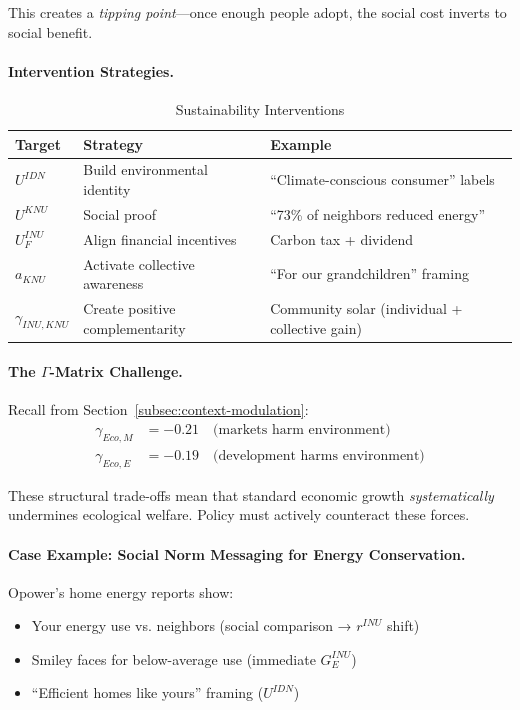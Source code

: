 This creates a \emph{tipping point}---once enough people adopt, 
the social cost inverts to social benefit.

\paragraph{Intervention Strategies.}

\begin{table}[htbp]
\centering
\caption{Sustainability Interventions}
\label{tab:sustainability-interventions}
\renewcommand{\arraystretch}{1.3}
\begin{tabular}{@{}lll@{}}
\toprule
\textbf{Target} & \textbf{Strategy} & \textbf{Example} \\
\midrule
$U^{IDN}$ & Build environmental identity & ``Climate-conscious consumer'' labels \\
$U^{KNU}$ & Social proof & ``73\% of neighbors reduced energy'' \\
$U^{INU}_{F}$ & Align financial incentives & Carbon tax + dividend \\
$a_{KNU}$ & Activate collective awareness & ``For our grandchildren'' framing \\
$\gamma_{INU,KNU}$ & Create positive complementarity & Community solar (individual + collective gain) \\
\bottomrule
\end{tabular}
\end{table}

\paragraph{The $\Gamma$-Matrix Challenge.}
Recall from Section~\ref{subsec:context-modulation}:
\begin{align}
\gamma_{Eco,M} &= -0.21 \quad \text{(markets harm environment)} \\
\gamma_{Eco,E} &= -0.19 \quad \text{(development harms environment)}
\end{align}

These structural trade-offs mean that standard economic growth 
\emph{systematically} undermines ecological welfare. Policy must 
actively counteract these forces.

\paragraph{Case Example: Social Norm Messaging for Energy Conservation.}
Opower's home energy reports show:
\begin{itemize}
\item Your energy use vs. neighbors (social comparison → $r^{INU}$ shift)
\item Smiley faces for below-average use (immediate $G^{INU}_E$)
\item ``Efficient homes like yours'' framing ($U^{IDN}$)
\end{itemize}

